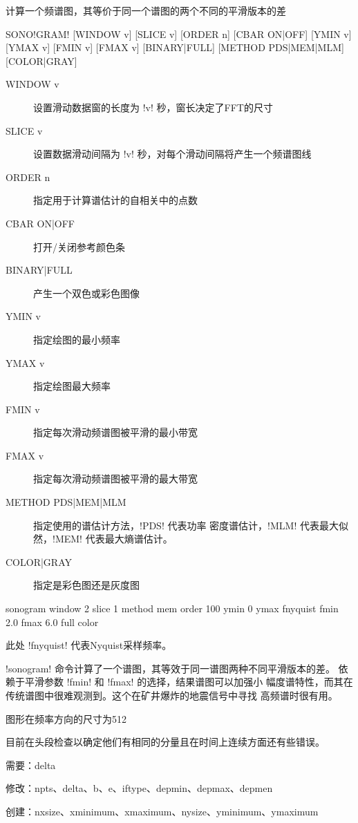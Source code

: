 \label{cmd:sonogram}

计算一个频谱图，其等价于同一个谱图的两个不同的平滑版本的差

\begin{SACSTX}
SONO!GRAM! [WINDOW v] [SLICE v] [ORDER n] [CBAR ON|OFF] [YMIN v] [YMAX v]
    [FMIN v] [FMAX v] [BINARY|FULL] [METHOD PDS|MEM|MLM] [COLOR|GRAY]
\end{SACSTX}

\begin{description}
\item [WINDOW v] 设置滑动数据窗的长度为 !v! 秒，窗长决定了FFT的尺寸
\item [SLICE v] 设置数据滑动间隔为 !v! 秒，对每个滑动间隔将产生一个频谱图线
\item [ORDER n] 指定用于计算谱估计的自相关中的点数
\item [CBAR ON|OFF] 打开/关闭参考颜色条
\item [BINARY|FULL] 产生一个双色或彩色图像
\item [YMIN v] 指定绘图的最小频率
\item [YMAX v] 指定绘图最大频率
\item [FMIN v] 指定每次滑动频谱图被平滑的最小带宽
\item [FMAX v] 指定每次滑动频谱图被平滑的最大带宽
\item [METHOD PDS|MEM|MLM] 指定使用的谱估计方法，!PDS! 代表功率
    密度谱估计，!MLM! 代表最大似然，!MEM! 代表最大熵谱估计。
\item [COLOR|GRAY] 指定是彩色图还是灰度图
\end{description}

\begin{SACDFT}
sonogram window 2 slice 1 method mem order 100 ymin 0 ymax fnyquist
    fmin 2.0 fmax 6.0 full color
\end{SACDFT}
此处 !fnyquist! 代表Nyquist采样频率。

!sonogram! 命令计算了一个谱图，其等效于同一谱图两种不同平滑版本的差。
依赖于平滑参数 !fmin! 和 !fmax! 的选择，结果谱图可以加强小
幅度谱特性，而其在传统谱图中很难观测到。这个在矿井爆炸的地震信号中寻找
高频谱时很有用。

图形在频率方向的尺寸为512

目前在头段检查以确定他们有相同的分量且在时间上连续方面还有些错误。

需要：delta

修改：npts、delta、b、e、iftype、depmin、depmax、depmen

创建：nxsize、xminimum、xmaximum、nysize、yminimum、ymaximum
